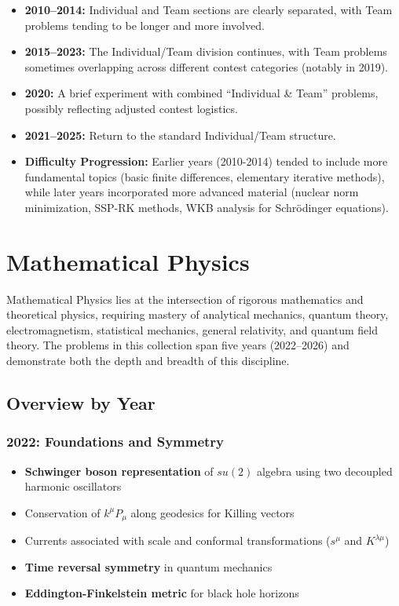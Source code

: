 \begin{itemize}
\item \textbf{2010--2014:} Individual and Team sections are clearly separated, with Team problems tending to be longer and more involved.

\item \textbf{2015--2023:} The Individual/Team division continues, with Team problems sometimes overlapping across different contest categories (notably in 2019).

\item \textbf{2020:} A brief experiment with combined ``Individual \& Team'' problems, possibly reflecting adjusted contest logistics.

\item \textbf{2021--2025:} Return to the standard Individual/Team structure.

\item \textbf{Difficulty Progression:} Earlier years (2010-2014) tended to include more fundamental topics (basic finite differences, elementary iterative methods), while later years incorporated more advanced material (nuclear norm minimization, SSP-RK methods, WKB analysis for Schr\"odinger equations).
\end{itemize}

\section{Mathematical Physics}
\label{sec:physics}

Mathematical Physics lies at the intersection of rigorous mathematics and theoretical physics, requiring mastery of analytical mechanics, quantum theory, electromagnetism, statistical mechanics, general relativity, and quantum field theory. The problems in this collection span five years (2022--2026) and demonstrate both the depth and breadth of this discipline.

\subsection{Overview by Year}

\subsubsection*{2022: Foundations and Symmetry}
\begin{itemize}
    \item \textbf{Schwinger boson representation} of $su(2)$ algebra using two decoupled harmonic oscillators
    \item Conservation of $k^\mu P_\mu$ along geodesics for Killing vectors
    \item Currents associated with scale and conformal transformations ($s^\mu$ and $K^{\lambda\mu}$)
    \item \textbf{Time reversal symmetry} in quantum mechanics
    \item \textbf{Eddington-Finkelstein metric} for black hole horizons
\end{itemize}

